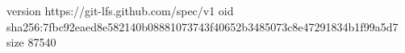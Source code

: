 version https://git-lfs.github.com/spec/v1
oid sha256:7fbc92eaed8e582140b08881073743f40652b3485073c8e47291834b1f99a5d7
size 87540
